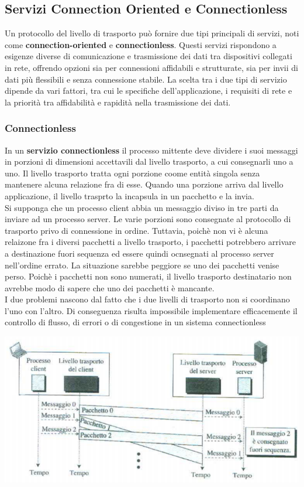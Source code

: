 \documentclass[12pt]{report}
\begin{document}
	\subsection{Servizi Connection Oriented e Connectionless}
	Un protocollo del livello di trasporto può fornire due tipi principali di servizi, noti come \textbf{connection-oriented} e \textbf{connectionless}. Questi servizi rispondono a esigenze diverse di comunicazione e trasmissione dei dati tra dispositivi collegati in rete, offrendo opzioni sia per connessioni affidabili e strutturate, sia per invii di dati più flessibili e senza connessione stabile. La scelta tra i due tipi di servizio dipende da vari fattori, tra cui le specifiche dell'applicazione, i requisiti di rete e la priorità tra affidabilità e rapidità nella trasmissione dei dati.

	\subsubsection{Connectionless}
	In un \textbf{servizio connectionless} il processo mittente deve dividere i suoi messaggi in porzioni di dimensioni accettavili dal livello trasporto, a cui consegnarli uno a uno. Il livello trasporto tratta ogni porzione coome entità singola senza mantenere alcuna relazione fra di esse. Quando una porzione arriva dal livello applicazione, il livello trasprto la incapsula in un pacchetto e la invia.
	\vspace{\baselineskip}\\
	Si supponga che un processo client abbia un messaggio diviso in tre parti da inviare ad un processo server. Le varie porzioni sono consegnate al protocollo di trasporto privo di connessione in ordine. Tuttavia, poichè non vi è alcuna relaizone fra i diversi pacchetti a livello trasporto, i pacchetti potrebbero arrivare a destinazione fuori sequenza ed essere quindi ocnsegnati al processo server nell'ordine errato. La situazione sarebbe peggiore se uno dei pacchetti venise perso. Poichè i pacchetti non sono numerati, il livello trasporto destinatario non avrebbe modo di sapere che uno dei pacchetti è mancante.
	\vspace{\baselineskip}\\
	I due problemi nascono dal fatto che i due livelli di trasporto non  si coordinano l'uno con l'altro. Di conseguenza risulta impossibile implementare efficacemente il controllo di flusso, di errori o di congestione in un sistema connectionless
	\begin{center}
		\includegraphics[scale=0.5]{assets/connless.png}
	\end{center}
\end{document}

